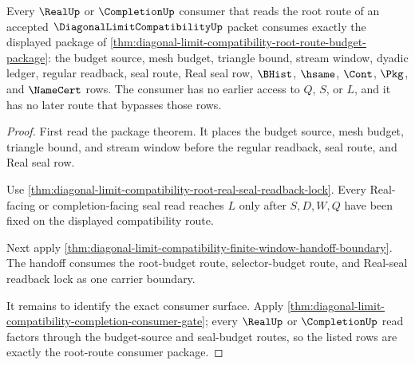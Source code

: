 \begin{theorem}
\label{thm:diagonal-limit-compatibility-root-route-consumer-exactness}
Every $\RealUp$ or $\CompletionUp$ consumer that reads the root route of an accepted $\DiagonalLimitCompatibilityUp$ packet consumes exactly the displayed package of \autoref{thm:diagonal-limit-compatibility-root-route-budget-package}: the budget source, mesh budget, triangle bound, stream window, dyadic ledger, regular readback, seal route, Real seal row, $\BHist$, $\hsame$, $\Cont$, $\Pkg$, and $\NameCert$ rows. The consumer has no earlier access to $Q$, $S$, or $L$, and it has no later route that bypasses those rows.
\end{theorem}
\begin{proof}
First read the package theorem. It places the budget source, mesh budget, triangle bound, and stream window before the regular readback, seal route, and Real seal row.

Use \autoref{thm:diagonal-limit-compatibility-root-real-seal-readback-lock}. Every Real-facing or completion-facing seal read reaches $L$ only after $S,D,W,Q$ have been fixed on the displayed compatibility route.

Next apply \autoref{thm:diagonal-limit-compatibility-finite-window-handoff-boundary}. The handoff consumes the root-budget route, selector-budget route, and Real-seal readback lock as one carrier boundary.

It remains to identify the exact consumer surface. Apply \autoref{thm:diagonal-limit-compatibility-completion-consumer-gate}; every $\RealUp$ or $\CompletionUp$ read factors through the budget-source and seal-budget routes, so the listed rows are exactly the root-route consumer package.
\end{proof}

